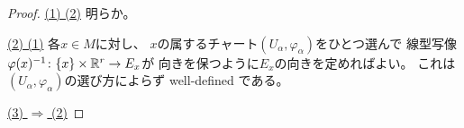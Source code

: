 \documentclass[report]{jlreq}
\begin{document}
\begin{proof}
    \uline{(1) \Rightarrow (2)} \quad
    明らか。

    \uline{(2) \Rightarrow (1)} \quad
    各$x \in M$に対し、
    $x$の属するチャート$(U_\alpha, \varphi_\alpha)$をひとつ選んで
    線型写像$\varphi(x)^{-1} \colon \{ x \} \times \mathbb{R}^r \to E_x$が
    向きを保つように$E_x$の向きを定めればよい。
    これは$(U_\alpha, \varphi_\alpha)$の選び方によらず
    well-defined である。

    \uline{(3) $\Rightarrow$ (2)} \quad



\end{proof}
\end{document}
